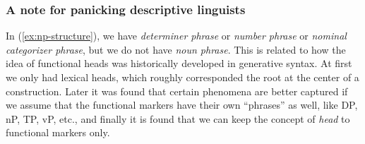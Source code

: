 \documentclass[a4paper, oneside, scheme=plain, 12pt]{article}
\newcommand*{\term}[1]{\emph{#1}}
\begin{document}
\subsubsection{A note for panicking descriptive linguists}\label{sec:remove-functional-heads}

In (\ref{ex:np-structure}), we have \term{determiner phrase} or \term{number phrase} or \term{nominal categorizer phrase},
but we do not have \term{noun phrase}.
This is related to how the idea of functional heads was historically developed in generative syntax.
At first we only had lexical heads, which roughly corresponded the root at the center of a construction.
Later it was found that certain phenomena are better captured
if we assume that the functional markers have their own ``phrases'' as well,
like DP, nP, TP, vP, etc.,
and finally it is found that we can keep the concept of \term{head} to functional markers only.
\end{document}
